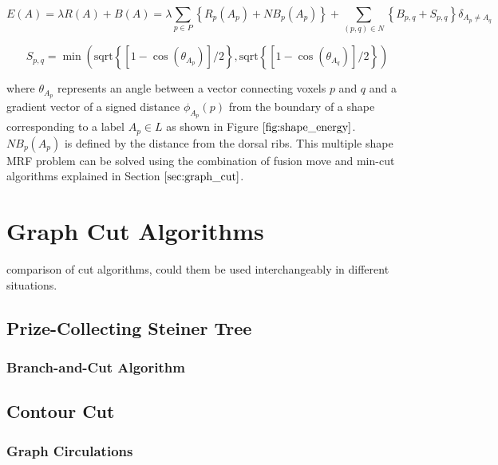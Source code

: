 \documentclass{SMBV12}
\begin{document}
\begin{equation}
E(A) = \lambda R(A) + B(A) = \lambda \sum_{p \in P} \left\lbrace  R_p(A_p) + NB_p(A_p) \right\rbrace + \sum_{(p, q) \in N} \left\lbrace B_{p, q} + S_{p, q} \right\rbrace \delta_{A_p \neq A_q}
\end{equation}

\begin{equation}
S_{p, q} = \min(\mathrm{sqrt}\left\lbrace [1 - \cos(\theta_{A_p})]/2 \right\rbrace, \mathrm{sqrt}\left\lbrace [1 - \cos(\theta_{A_q})]/2 \right\rbrace )
\end{equation}

where $\theta_{A_p}$ represents an angle between a vector connecting voxels $p$ and $q$ and a gradient vector of a signed distance $\phi_{A_p}(p)$ from the boundary of a shape corresponding to a label $A_p \in L$ as shown in Figure $\ref{fig:shape_energy}$. $NB_p(A_p)$ is defined by the distance from the dorsal ribs. This multiple shape MRF problem can be solved using the combination of fusion move and min-cut algorithms explained in Section $\ref{sec:graph_cut}$.

\section{Graph Cut Algorithms}

comparison of cut algorithms, could them be used interchangeably in different situations.

\subsection{Prize-Collecting Steiner Tree}
\label{sec:branch_and_cut}
\cite{ljubic2006algorithmic}

\subsubsection{Branch-and-Cut Algorithm}

\subsection{Contour Cut}
\label{sec:normalized_cut}

\cite{shi2000normalized}

\subsubsection{Graph Circulations}
\end{document}
